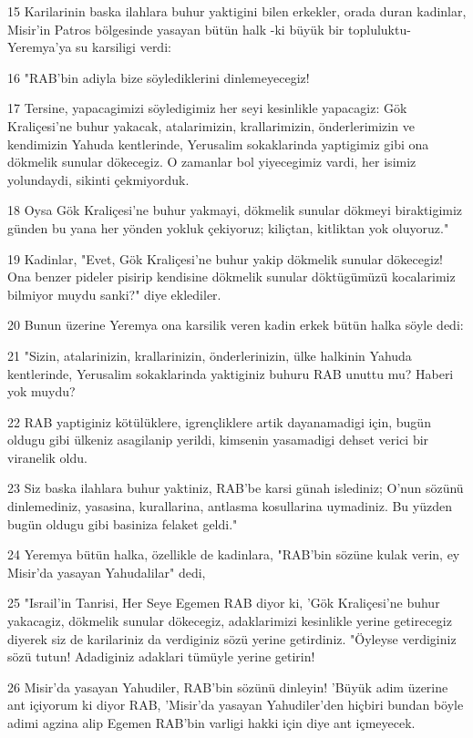 \par 15 Karilarinin baska ilahlara buhur yaktigini bilen erkekler, orada duran kadinlar, Misir'in Patros bölgesinde yasayan bütün halk -ki büyük bir topluluktu- Yeremya'ya su karsiligi verdi:
\par 16 "RAB'bin adiyla bize söylediklerini dinlemeyecegiz!
\par 17 Tersine, yapacagimizi söyledigimiz her seyi kesinlikle yapacagiz: Gök Kraliçesi'ne buhur yakacak, atalarimizin, krallarimizin, önderlerimizin ve kendimizin Yahuda kentlerinde, Yerusalim sokaklarinda yaptigimiz gibi ona dökmelik sunular dökecegiz. O zamanlar bol yiyecegimiz vardi, her isimiz yolundaydi, sikinti çekmiyorduk.
\par 18 Oysa Gök Kraliçesi'ne buhur yakmayi, dökmelik sunular dökmeyi biraktigimiz günden bu yana her yönden yokluk çekiyoruz; kiliçtan, kitliktan yok oluyoruz."
\par 19 Kadinlar, "Evet, Gök Kraliçesi'ne buhur yakip dökmelik sunular dökecegiz! Ona benzer pideler pisirip kendisine dökmelik sunular döktügümüzü kocalarimiz bilmiyor muydu sanki?" diye eklediler.
\par 20 Bunun üzerine Yeremya ona karsilik veren kadin erkek bütün halka söyle dedi:
\par 21 "Sizin, atalarinizin, krallarinizin, önderlerinizin, ülke halkinin Yahuda kentlerinde, Yerusalim sokaklarinda yaktiginiz buhuru RAB unuttu mu? Haberi yok muydu?
\par 22 RAB yaptiginiz kötülüklere, igrençliklere artik dayanamadigi için, bugün oldugu gibi ülkeniz asagilanip yerildi, kimsenin yasamadigi dehset verici bir viranelik oldu.
\par 23 Siz baska ilahlara buhur yaktiniz, RAB'be karsi günah islediniz; O'nun sözünü dinlemediniz, yasasina, kurallarina, antlasma kosullarina uymadiniz. Bu yüzden bugün oldugu gibi basiniza felaket geldi."
\par 24 Yeremya bütün halka, özellikle de kadinlara, "RAB'bin sözüne kulak verin, ey Misir'da yasayan Yahudalilar" dedi,
\par 25 "Israil'in Tanrisi, Her Seye Egemen RAB diyor ki, 'Gök Kraliçesi'ne buhur yakacagiz, dökmelik sunular dökecegiz, adaklarimizi kesinlikle yerine getirecegiz diyerek siz de karilariniz da verdiginiz sözü yerine getirdiniz. "Öyleyse verdiginiz sözü tutun! Adadiginiz adaklari tümüyle yerine getirin!
\par 26 Misir'da yasayan Yahudiler, RAB'bin sözünü dinleyin! 'Büyük adim üzerine ant içiyorum ki diyor RAB, 'Misir'da yasayan Yahudiler'den hiçbiri bundan böyle adimi agzina alip Egemen RAB'bin varligi hakki için diye ant içmeyecek.
